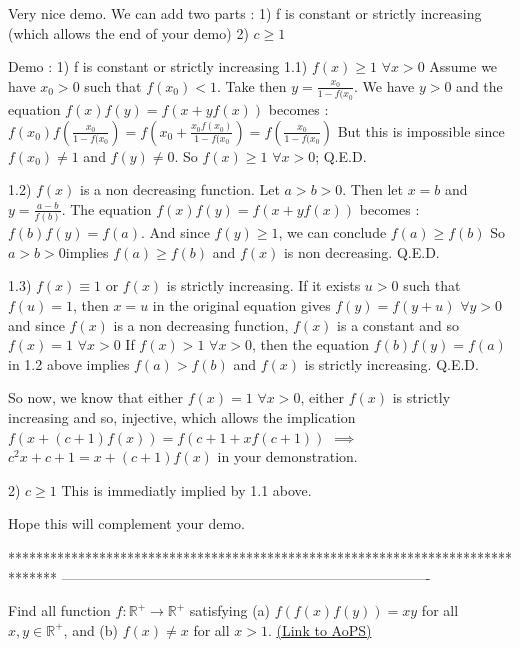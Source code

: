 \begin{mysolution}


Very nice demo. We can add two parts :
1) f is constant or strictly increasing (which allows the end of your demo)
2) $ c\geq 1$

Demo :
1) f is constant or strictly increasing
1.1) $ f(x)\geq 1$ $ \forall x>0$
Assume we have $ x_{0}>0$ such that $ f(x_{0})<1$. Take then $ y=\frac{x_{0}}{1-f(x_{0}}$. We have $ y>0$ and the equation $ f(x)f(y)=f(x+yf(x))$ becomes :
$ f(x_{0})f(\frac{x_{0}}{1-f(x_{0}})=f(x_{0}+\frac{x_{0}f(x_{0})}{1-f(x_{0}})=f(\frac{x_{0}}{1-f(x_{0}})$
But this is impossible since $ f(x_{0})\neq 1$ and $ f(y)\neq 0$. So $ f(x)\geq 1$ $ \forall x>0$; Q.E.D.

1.2) $ f(x)$ is a non decreasing function.
Let $ a>b>0$. Then let $ x=b$ and $ y=\frac{a-b}{f(b)}$. The equation $ f(x)f(y)=f(x+yf(x))$ becomes : $ f(b)f(y)=f(a)$. And since $ f(y)\geq 1$, we can conclude $ f(a)\geq f(b)$
So $ a>b>0$implies $ f(a)\geq f(b)$ and $ f(x)$ is non decreasing. Q.E.D.

1.3) $ f(x)\equiv 1$ or $ f(x)$ is strictly increasing.
If it exists $ u>0$ such that $ f(u)=1$, then $ x=u$ in the original equation gives $ f(y)=f(y+u)$ $ \forall y>0$ and since $ f(x)$ is a non decreasing function,  $ f(x)$ is a constant and so $ f(x)=1$ $ \forall x>0$
If $ f(x)>1$ $ \forall x>0$, then the equation $ f(b)f(y)=f(a)$ in 1.2 above implies $ f(a)>f(b)$ and $ f(x)$ is strictly increasing.
Q.E.D.

So now, we know that either $ f(x)=1$ $ \forall x>0$, either $ f(x)$ is strictly increasing and so, injective, which allows the implication $ f(x+(c+1)f(x))=f(c+1+xf(c+1))$ $ \implies$ $ c^{2}x+c+1=x+(c+1)f(x)$ in your demonstration.


2) $ c\geq 1$
This is immediatly implied by 1.1 above.

Hope this will complement your demo.
\end{mysolution}



*******************************************************************************
-------------------------------------------------------------------------------

\begin{problem}
	Find all function $f: \mathbb R^{+} \to \mathbb R^{+}$ satisfying
(a) $ f(f(x)f(y))=xy$ for all $ x, y \in \mathbb R^{+}$, and
(b) $ f(x)\neq x$ for all $ x>1$.
	\flushright \href{https://artofproblemsolving.com/community/c6h161306}{(Link to AoPS)}
\end{problem}



